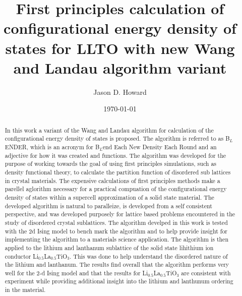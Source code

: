 \documentclass[ aip,jmp,bmf,sd,rsi, amsmath,amssymb,preprint, reprint,author-year,author-numerical, Conference Proceedings]{revtex4-1}
\begin{document}

\title[Sample title]{First principles calculation of configurational energy density of states for LLTO with new Wang and Landau algorithm variant}

\author{Jason D. Howard}


\date{\today}%

\begin{abstract}
In this work  a variant of the Wang and Landau algorithm   for calculation of  the configurational energy density of states is proposed. The algorithm is referred to as B$_L$ENDER, which is an acronym for B$_L$end Each New Density Each Round and an  adjective for  how it was created and functions. The algorithm was developed for the purpose of working towards the goal of using first principles simulations, such as density functional theory, to calculate the partition function of disordered sub lattices in crystal materials. The expensive calculations of first principles methods make a parellel aglorithm necessary for a practical compuation of the configurational energy density of states within a supercell approximation of a solid state material. The developed algorithm is natural to paralleize, is developed from a self consistent perspective, and was developed purposely for lattice based problems encountered in the study of disordered crystal sublattices.  The algorithm develped in this work is tested with the 2d Ising model to bench mark the algorithm and to help provide insight for implementing the algorithm to a materials science application. The algorithm is then applied to the lithium and lanthanum sublattice of the solid state lihithium ion conductor Li$_{0.5}$La$_{0.5}$TiO$_{3}$. This was done to help understand the disordered nature of the lithium and lanthanum. The results find overall that the algorithm performs very well for the 2-d Ising model and that the results for Li$_{0.5}$La$_{0.5}$TiO$_{3}$ are consistent with experiment while providing additional insight into the lithium and lanthunum ordering in the material. 
\end{abstract}

\maketitle
\end{document}
